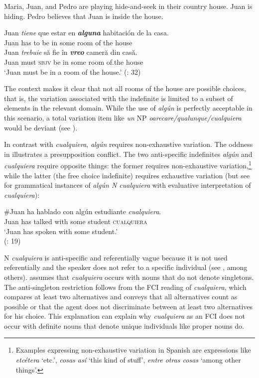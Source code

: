 \ea %
\label{bkm:Ref533761939}  Maria, Juan, and Pedro are playing hide-and-seek in their country house. Juan is hiding. Pedro believes that Juan is inside the house.

\ea  \gll Juan \textit{tiene} que estar en \textbf{\textit{alguna}} habitación de la casa.\\
Juan has to be in some room of the house\\

\ex \gll Juan \textit{trebuie} să fie în \textbf{\textit{vreo}} cameră din casă.\\
Juan must \textsc{sbjv} be in some room of.the house\\
    \glt ‘Juan must be in a room of the house.’
    (\citealt{Fălăuş2014}: 32)
\z
\z

The context makes it clear that not all rooms of the house are possible choices, that is, the variation associated with the indefinite is limited to a subset of elements in the relevant domain. While the use of \textit{algún} is perfectly acceptable in this scenario, a total variation item like \textit{un} NP \textit{oarecare/qualunque/cualquiera} would be deviant (see \citealt{Fălăuş2014}).

In contrast with \textit{cualquiera}, \textit{algún} requires non-exhaustive variation. The oddness in  illustrates a presupposition conflict. The two anti-specific indefinites \textit{algún} and \textit{cualquiera} require opposite things: the former requires non-exhaustive variation,\footnote{Examples expressing non-exhaustive variation in Spanish are expressions like \textit{etcétera} ‘etc.’, \textit{cosas así} ‘this kind of stuff’, \textit{entre otras cosas} ‘among other things’.} while the latter (the free choice indefinite) requires exhaustive variation (but see  for grammatical instances of \textit{algún N cualquiera} with evaluative interpretation of \textit{cualquiera}):

\ea %
\label{bkm:Ref533761963}  
\gll \#Juan ha hablado con algún estudiante \textit{cualquiera}.\\
{Juan} has talked with some student \textsc{cualquiera}\\
\glt ‘{Juan} has spoken with some student.’\\
  (\citealt{Etxeberria2014}: 19)
\z

N \textit{cualquiera} is anti-specific and referentially vague because it is not used referentially and the speaker does not refer to a specific individual (see \citealt{GiannakidouQuer2013}, among others). \citet{Menéndez-Benito2010} assumes that \textit{cualquiera} occurs with nouns that do not denote singletons. The anti-singleton restriction follows from the FCI reading of \textit{cualquiera}, which compares at least two alternatives and conveys that all alternatives count as possible or that the agent does not discriminate between at least two alternatives for his choice. This explanation can explain why \textit{cualquiera} as an FCI does not occur with definite nouns that denote unique individuals like proper nouns do.

